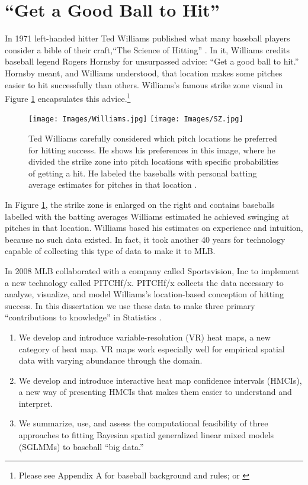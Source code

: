 \section{``Get a Good Ball to Hit''}
In 1971 left-handed hitter Ted Williams published what many baseball players consider a bible of their craft,``The Science of Hitting'' \citep{Williams1971}. In it, Williams credits baseball legend Rogers Hornsby for unsurpassed advice: ``Get a good ball to hit.'' Hornsby meant, and Williams understood, that location makes some pitches easier to hit successfully than others. Williams's famous strike zone visual in Figure \ref{fig:Williams} encapsulates this advice.\footnote{Please see Appendix A for baseball background and rules; or \citep{Wiki}}
        \begin{figure}[H]
      	\centering
      	\texttt{[image: Images/Williams.jpg]} 
      	\texttt{[image: Images/SZ.jpg]}
      	\caption{Ted Williams carefully considered which pitch locations he preferred for hitting success. He shows his preferences in this image, where he divided the strike zone into pitch locations with specific probabilities of getting a hit. He labeled the baseballs with personal batting average estimates for pitches in that location \citep{Williams1971}.}
      	\label{fig:Williams}
      	\end{figure} 
In Figure \ref{fig:Williams}, the strike zone is enlarged on the right and contains baseballs labelled with the batting averages Williams estimated he achieved swinging at pitches in that location. Williams based his estimates on experience and intuition, because no such data existed. In fact, it took another 40 years for technology capable of collecting this type of data to make it to MLB\textsuperscript{\textregistered}.

In 2008 MLB collaborated with a company called Sportsvision, Inc to implement a new technology called PITCHf/x\textsuperscript{\textregistered}. PITCHf/x\textsuperscript{\textregistered} collects the data necessary to analyze, visualize, and model Williams's location-based conception of hitting success. In this dissertation we use these data to make three primary ``contributions to knowledge'' in Statistics \citep{OSUguide}.
\begin{enumerate}
\item We develop and introduce variable-resolution (VR) heat maps, a new category of heat map. VR maps work especially well for empirical spatial data with varying abundance through the domain. 
\item We develop and introduce interactive heat map confidence intervals (HMCIs), a new way of presenting HMCIs that makes them easier to understand and interpret.
\item We summarize, use, and assess the computational feasibility of three approaches to fitting Bayesian spatial generalized linear mixed models (SGLMMs) to baseball ``big data.''
\end{enumerate}

